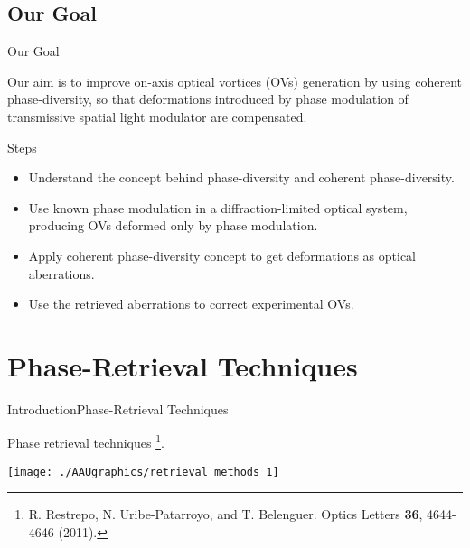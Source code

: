 \documentclass[10pt]{beamer}
\begin{document}
\subsection{Our Goal}
\begin{frame}{Our Goal}

Our aim is to improve on-axis optical vortices (OVs) generation by using coherent phase-diversity, so that deformations introduced by phase modulation of transmissive spatial light modulator are compensated.
\pause
\begin{block}{Steps}
\begin{itemize}
 \item<1-> Understand the concept behind phase-diversity and coherent phase-diversity.
 \pause
 \item<2-> Use known phase modulation in a diffraction-limited optical system, producing OVs deformed only by phase modulation.
 \pause
 \item<3-> Apply coherent phase-diversity concept to get deformations as optical aberrations.
 \pause
 \item<4-> Use the retrieved aberrations to correct experimental OVs.
\end{itemize}
\end{block}

\end{frame}



\section{Phase-Retrieval Techniques}
\begin{frame}{Introduction}{Phase-Retrieval Techniques}

Phase  retrieval techniques \footnote[4]{\scriptsize R. Restrepo, N. Uribe-Patarroyo, and T. Belenguer. Optics Letters \textbf{36}, 4644-4646 (2011).}.

\begin{center}
\vspace{20pt}
\hspace*{-10pt}
\texttt{[image: ./AAUgraphics/retrieval\_methods\_1]}
\end{center}
\end{frame}
\end{document}
